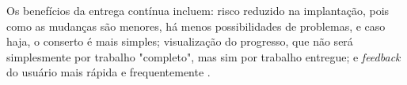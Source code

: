 
Os benefícios da entrega contínua incluem: risco reduzido na implantação, pois como as mudanças são menores, há menos possibilidades de problemas, e caso haja, o conserto é mais simples; visualização do progresso, que não será simplesmente por trabalho "completo", mas sim por trabalho entregue; e \emph{feedback} do usuário mais rápida e frequentemente \cite{martin-fowler-continuous-delivery}.




